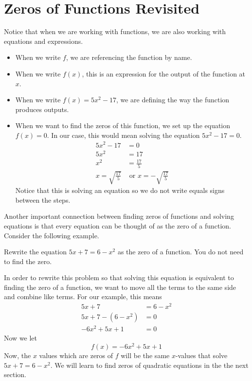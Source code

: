 \documentclass{ximera}
\begin{document}
\section{Zeros of Functions Revisited}
Notice that when we are working with functions, we are also working with equations and expressions.  
\begin{itemize}
\item When we write $f$, we are referencing the function by name.  
\item When we write $f(x)$, this is an expression for the output of the function at $x$.
\item When we write $f(x)=5x^2-17$, we are defining the way the function produces outputs.
\item When we want to find the zeros of this function, we set up the equation $f(x)=0$.  In our case, this would mean solving the equation $5x^2-17=0$.
\begin{align*}
5x^2-17&=0\\
5x^2&=17\\
x^2&=\frac{17}{5}\\
x=\sqrt{\frac{17}{5}} &\text{  or  }  x=-\sqrt{\frac{17}{5}}
\end{align*}  
Notice that this is solving an equation so we do not write equals signs between the steps.
\end{itemize}

Another important connection between finding zeros of functions and solving equations is that every equation can be thought of as the zero of a function.  Consider the following example.

\begin{example}
Rewrite the equation $5x+7=6-x^2$ as the zero of a function.  You do not need to find the zero.

\begin{explanation}
In order to rewrite this problem so that solving this equation is equivalent to finding the zero of a function, we want to move all the terms to the same side and combine like terms.  For our example, this means
\begin{align*}
5x+7&=6-x^2\\
5x+7 -(6-x^2)&=0\\
-6x^2+5x+1&=0
\end{align*}
Now we let
\[f(x)=-6x^2+5x+1\]
Now, the $x$ values which are zeros of $f$ will be the same $x$-values that solve $5x+7=6-x^2$.  We will learn to find zeros of quadratic equations in the the next section.
\end{explanation}
\end{example}
\end{document}
